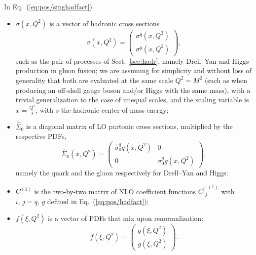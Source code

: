 In Eq.~(\ref{eq:pos/singhadfact}) \begin{itemize}
  \item $\sigma(x,Q^2)$ is a vector of hadronic cross sections
\begin{equation}\label{eq:pos/hadxsec}
   \sigma(x,Q^2)=\left(\begin{array}{c} \sigma^{q}(x,Q^2)\\ \sigma^{g} (x,Q^2)\end{array}\right),
\end{equation}
 such as
the pair of processes of Sect.~\ref{sec:hadr}, namely Drell--Yan  and
Higgs production in gluon fusion; we are assuming for simplicity  and without loss of
generality that both are evaluated at the same scale $Q^2=M^2$ (such
as when producing an off-shell gauge boson and/or Higgs with the same
mass), with a trivial generalization to the case of unequal scales,
and the scaling variable is $x=\frac{Q^2}{s}$, with $s$ the hadronic
center-of-mass energy;
\item $\hat \Sigma_0$ is a diagonal matrix of LO partonic cross sections,
  multiplied by the respective PDFs, 
\begin{equation}\label{eq:pos/lohadxsec}
   \hat \Sigma_0(x,Q^2)=\left(\begin{array}{cc} \hat \sigma_0^{q} q (x,Q^2) &
   0 \\0 & \sigma_0^{g} g (x,Q^2) \end{array}\right),
\end{equation}
namely the quark and the gluon respectively for Drell--Yan and Higgs;
\item $C^{(1)}$ is the two-by-two matrix of NLO 
  coefficient functions ${C^i{}_{j}}^{(1)}$ with $i,\, j=q,\, g$
  defined in Eq.~(\ref{eq:pos/hadfact});
\item $f(\xi,Q^2)$ is a vector of PDFs that mix upon renormalization:
\begin{equation}\label{eq:pos/singpdf}
   f(\xi,Q^2)=\left(\begin{array}{c} q(\xi,Q^2) \\ g(\xi,Q^2) \end{array}\right).
\end{equation}
\end{itemize}


